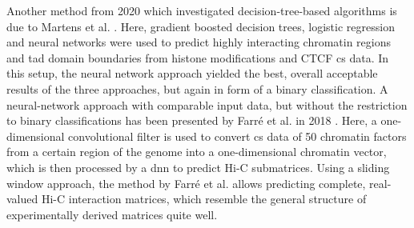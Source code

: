 Another method from 2020 which investigated decision-tree-based algorithms is due to Martens et al. \cite{Martens2020}.
Here, gradient boosted decision trees, logistic regression and neural networks were used to predict highly interacting chromatin regions
and \acrshort{tad} domain boundaries from histone modifications and CTCF \acrshort{cs} data. 
In this setup, the neural network approach yielded the best, overall acceptable results of the three approaches,
but again in form of a binary classification.
A neural-network approach with comparable input data, but without the restriction to binary classifications has been presented by Farr\'e et al. in 2018 \cite{Farre2018a}. 
Here, a one-dimensional convolutional filter is used to convert \acrshort{cs} data of 50 chromatin factors from a certain region of the genome into a 
one-dimensional chromatin vector, which is then processed by a \acrfull{dnn} to predict Hi-C submatrices.
Using a sliding window approach, the method by Farr\'e et al. allows predicting complete, real-valued Hi-C interaction matrices, 
which resemble the general structure of experimentally derived matrices quite well.

